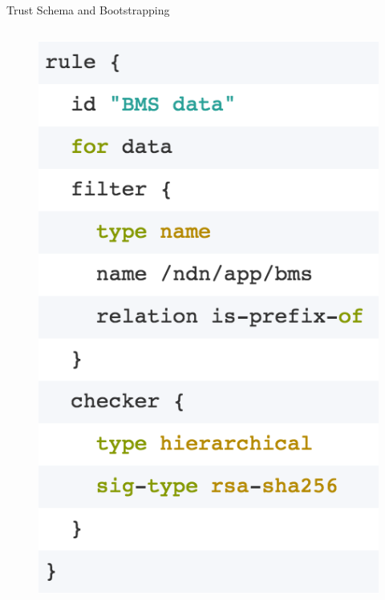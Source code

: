 \documentclass[final,hyperref={pdfpagelabels=false},20pt]{beamer}
\begin{document}
\begin{frame}[t]
\begin{columns}[t]
\begin{column}{.465\textwidth}
\begin{block}{Trust Schema and Bootstrapping}
\begin{columns}[T]
\begin{column}{.25\textwidth}
\begin{figure}
\includegraphics[width=\linewidth]{trust-schema-data.png}
\label{fig:trust-schema-data}
\end{figure}
\end{column}


\end{columns}
\end{block}
\end{column}
\end{columns}
\end{frame}
\end{document}
